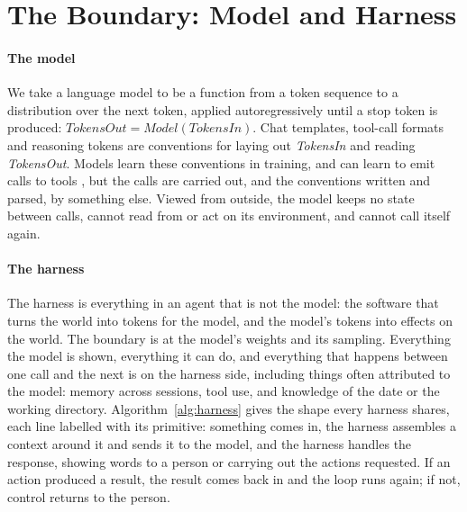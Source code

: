 \section{The Boundary: Model and Harness}
\label{sec:boundary}
\paragraph{The model} We take a language model to be a function from a token sequence to a distribution over the next token, applied autoregressively until a stop token is produced: $\textit{TokensOut} = \textit{Model}(\textit{TokensIn})$. Chat templates, tool-call formats and reasoning tokens are conventions for laying out \textit{TokensIn} and reading \textit{TokensOut}. Models learn these conventions in training, and can learn to emit calls to tools \cite{schick2023toolformer}, but the calls are carried out, and the conventions written and parsed, by something else. Viewed from outside, the model keeps no state between calls, cannot read from or act on its environment, and cannot call itself again.

\paragraph{The harness} The harness is everything in an agent that is not the model: the software that turns the world into tokens for the model, and the model's tokens into effects on the world. The boundary is at the model's weights and its sampling. Everything the model is shown, everything it can do, and everything that happens between one call and the next is on the harness side, including things often attributed to the model: memory across sessions, tool use, and knowledge of the date or the working directory. Algorithm~\ref{alg:harness} gives the shape every harness shares, each line labelled with its primitive: something comes in, the harness assembles a context around it and sends it to the model, and the harness handles the response, showing words to a person or carrying out the actions requested. If an action produced a result, the result comes back in and the loop runs again; if not, control returns to the person.

